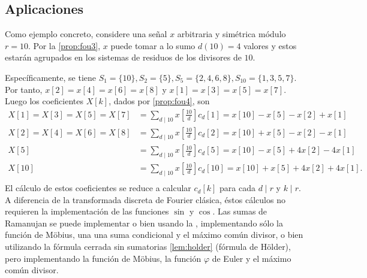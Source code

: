 \subsection{Aplicaciones}

\begin{example}
Como ejemplo concreto, considere una señal $x$ arbitraria y simétrica módulo $r=10$. Por la \cref{prop:fou3}, $x$ puede tomar a lo sumo $d(10)=4$ valores y estos estarán agrupados en los sistemas de residuos de los divisores de $10$.
\bigskip

Específicamente, se tiene $S_1 = \{ 10 \}, S_2 = \{ 5 \}, S_5 = \{ 2, 4, 6, 8 \}, S_{10} = \{ 1, 3, 5, 7 \}$. Por tanto, $x[2]=x[4]=x[6]=x[8]$ y $x[1]=x[3]=x[5]=x[7]$. Luego los coeficientes $X[k]$, dados por \ref{prop:fou4}, son
\begin{align*}
    X[1] = X[3] = X[5] = X[7] & = \sum_{d \mid 10} x \left[ \frac{10}{d} \right] c_d[1] = x[10] - x[5] - x[2] + x[1] \\
    X[2] = X[4] = X[6] = X[8] & = \sum_{d \mid 10} x \left[ \frac{10}{d} \right] c_d[2] = x[10] + x[5] - x[2] - x[1] \\
    X[5] & = \sum_{d \mid 10} x \left[ \frac{10}{d} \right] c_d[5] = x[10] - x[5] + 4 x[2] - 4 x[1] \\
    X[10] & = \sum_{d \mid 10} x \left[ \frac{10}{d} \right] c_d[10] = x[10] + x[5] + 4 x[2] + 4 x[1]. \\
\end{align*}
El cálculo de estos coeficientes se reduce a calcular $c_d[k]$ para cada $d \mid r$ y $k \mid r$. A diferencia de la transformada discreta de Fourier clásica, éstos cálculos no requieren la implementación de las funciones $\sin$ y $\cos$. Las sumas de Ramanujan se puede implementar o bien usando la , implementando sólo la función de Möbius, una una suma condicional y el máximo común divisor, o bien utilizando la fórmula cerrada sin sumatorias \ref{lem:holder} (fórmula de Hölder), pero implementando la función de Möbius, la función $\varphi$ de Euler y el máximo común divisor.
\end{example}

